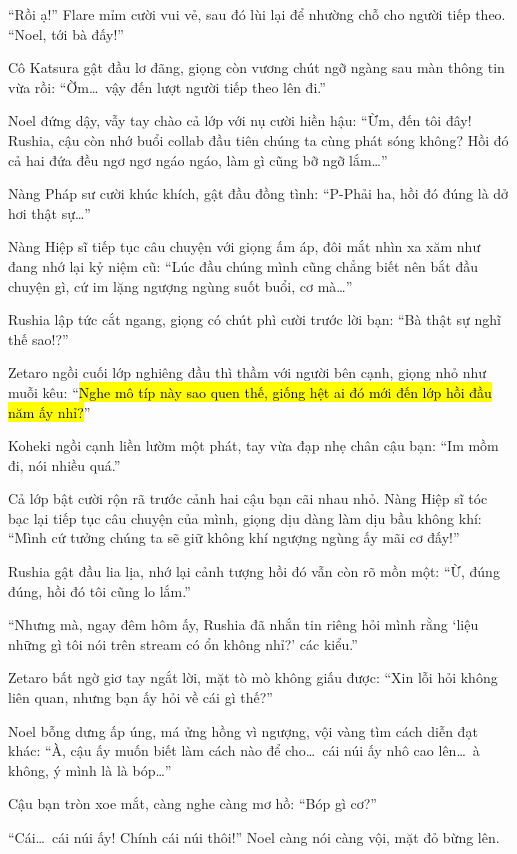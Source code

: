 \documentclass[../main.tex]{subfiles}
\begin{document}
``Rồi ạ!'' Flare mỉm cười vui vẻ, sau đó lùi lại để nhường chỗ cho người tiếp theo. ``Noel, tới bà đấy!''

Cô Katsura gật đầu lơ đãng, giọng còn vương chút ngỡ ngàng sau màn thông tin vừa rồi: ``Ờm\dots\ vậy đến lượt người tiếp theo lên đi.''

Noel đứng dậy, vẫy tay chào cả lớp với nụ cười hiền hậu: ``Ừm, đến tôi đây! Rushia, cậu còn nhớ buổi collab đầu tiên chúng ta cùng phát sóng không? Hồi đó cả hai đứa đều ngơ ngơ ngáo ngáo, làm gì cũng bỡ ngỡ lắm\dots''

Nàng Pháp sư cười khúc khích, gật đầu đồng tình: ``P-Phải ha, hồi đó đúng là dở hơi thật sự\dots''

Nàng Hiệp sĩ tiếp tục câu chuyện với giọng ấm áp, đôi mắt nhìn xa xăm như đang nhớ lại kỷ niệm cũ: ``Lúc đầu chúng mình cũng chẳng biết nên bắt đầu chuyện gì, cứ im lặng ngượng ngùng suốt buổi, cơ mà\dots''

Rushia lập tức cắt ngang, giọng có chút phì cười trước lời bạn: ``Bà thật sự nghĩ thế sao!?''

Zetaro ngồi cuối lớp nghiêng đầu thì thầm với người bên cạnh, giọng nhỏ như muỗi kêu: ``\hl{Nghe mô típ này sao quen thế, giống hệt ai đó mới đến lớp hồi đầu năm ấy nhỉ?}''

Koheki ngồi cạnh liền lườm một phát, tay vừa đạp nhẹ chân cậu bạn: ``Im mồm đi, nói nhiều quá.''

Cả lớp bật cười rộn rã trước cảnh hai cậu bạn cãi nhau nhỏ. Nàng Hiệp sĩ tóc bạc lại tiếp tục câu chuyện của mình, giọng dịu dàng làm dịu bầu không khí: ``Mình cứ tưởng chúng ta sẽ giữ không khí ngượng ngùng ấy mãi cơ đấy!''

Rushia gật đầu lia lịa, nhớ lại cảnh tượng hồi đó vẫn còn rõ mồn một: ``Ừ, đúng đúng, hồi đó tôi cũng lo lắm.''

``Nhưng mà, ngay đêm hôm ấy, Rushia đã nhắn tin riêng hỏi mình rằng `liệu những gì tôi nói trên stream có ổn không nhỉ?' các kiểu.''

Zetaro bất ngờ giơ tay ngắt lời, mặt tò mò không giấu được: ``Xin lỗi hỏi không liên quan, nhưng bạn ấy hỏi về cái gì thế?''

Noel bỗng dưng ấp úng, má ửng hồng vì ngượng, vội vàng tìm cách diễn đạt khác: ``À, cậu ấy muốn biết làm cách nào để cho\dots\ cái núi ấy nhô cao lên\dots\ à không, ý mình là là bóp\dots''

Cậu bạn tròn xoe mắt, càng nghe càng mơ hồ: ``Bóp gì cơ?''

``Cái\dots\ cái núi ấy! Chính cái núi thôi!'' Noel càng nói càng vội, mặt đỏ bừng lên.
\end{document}
